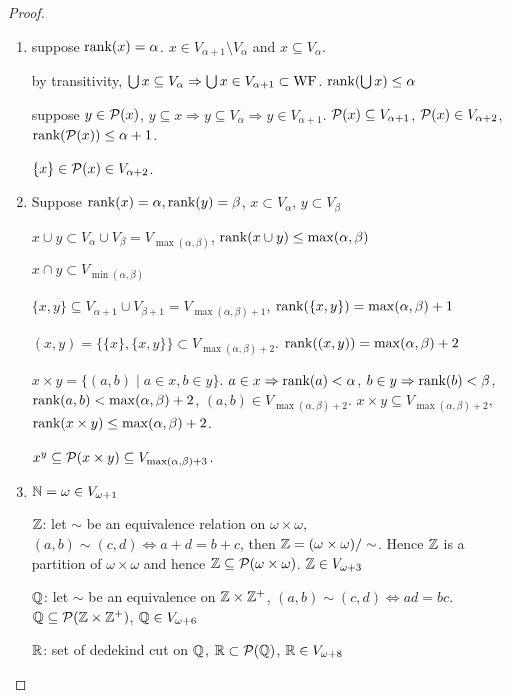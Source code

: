 \documentclass[11pt]{article}
\begin{document}
\begin{proof}
\begin{enumerate}
\item suppose \(\text{rank}(x)=\alpha\). \(x\in V_{\alpha+1}\setminus V_\alpha\) and \(x\subseteq V_\alpha\).

by transitivity, \(\bigcup x\subseteq V_\alpha\Rightarrow \bigcup x\in V_{\alpha+1}\subset\operatorname{WF}\). \(\text{rank}(\bigcup x)\le\alpha\)

suppose
\(y\in\mathcal{P}(x)\),
\(y\subseteq x\Rightarrow y\subseteq V_\alpha\Rightarrow y\in V_{\alpha+1}\). \(\mathcal{P}(x)\subseteq V_{\alpha+1}\), \(\mathcal{P}(x)\in V_{\alpha+2}\), \(\text{rank}(\mathcal{P}(x))\le\alpha+1\).

\(\{x\}\in\mathcal{P}(x)\in V_{\alpha+2}\).

\item Suppose \(\text{rank}(x)=\alpha,\text{rank}(y)=\beta\), \(x\subset V_\alpha\), \(y\subset V_\beta\)

\(x\cup y\subset V_\alpha\cup V_\beta=V_{\max(\alpha,\beta)}\), \(\text{rank}(x\cup y)\le\max(\alpha,\beta)\)

\(x\cap y\subset V_{\min(\alpha,\beta)}\)

\(\{x,y\}\subseteq V_{\alpha+1}\cup V_{\beta+1}=V_{\max(\alpha,\beta)+1}\), \(\text{rank}(\{x,y\})=\max(\alpha,\beta)+1\)

\((x,y)=\{\{x\},\{x,y\}\}\subset V_{\max(\alpha,\beta)+2}\). \(\text{rank}((x,y))=\max(\alpha,\beta)+2\)

\(x\times y=\{(a,b)\mid a\in x,b\in y\}\).
\(a\in x\Rightarrow\text{rank}(a)<\alpha\), \(b\in y\Rightarrow\text{rank}(b)<\beta\), \(\text{rank}(a,b)<\max(\alpha,\beta)+2\),
\((a,b)\in V_{\max(\alpha,\beta)+2}\). \(x\times y\subseteq V_{\max(\alpha,\beta)+2}\), \(\text{rank}(x\times y)\le\max(\alpha,\beta)+2\).

\(x^y\subseteq\mathcal{P}(x\times y)\subseteq V_{\max(\alpha,\beta)+3}\).

\item \(\mathbb{N}=\omega\in V_{\omega+1}\)

\(\mathbb{Z}\): let \(\sim\) be an equivalence relation on \(\omega\times\omega\), \((a,b)\sim(c,d)\Leftrightarrow a+d=b+c\),
then \(\mathbb{Z}=(\omega\times\omega)/\sim\). Hence \(\mathbb{Z}\) is a partition of \(\omega\times\omega\) and
hence \(\mathbb{Z}\subseteq\mathcal{P}(\omega\times\omega)\). \(\mathbb{Z}\in V_{\omega+3}\)

\(\mathbb{Q}\): let \(\sim\) be an equivalence
on \(\mathbb{Z}\times\mathbb{Z}^+\), \((a,b)\sim(c,d)\Leftrightarrow ad=bc\). \(\mathbb{Q}\subseteq\mathcal{P}(\mathbb{Z}\times\mathbb{Z}^+)\), \(\mathbb{Q}\in V_{\omega+6}\)

\(\mathbb{R}\): set of dedekind cut on \(\mathbb{Q}\), \(\mathbb{R}\subset\mathcal{P}(\mathbb{Q})\), \(\mathbb{R}\in V_{\omega+8}\)


\end{enumerate}
\end{proof}
\end{document}
